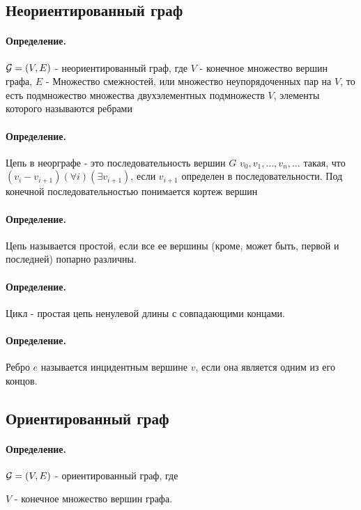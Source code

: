 \documentclass{report}
\begin{document}
\subsection{Неориентированный граф}
\paragraph*{Определение.}
$ {\cal G} = (V, E)$ - неориентированный граф, где $V$ - 
конечное множество вершин графа, $E$ - Множество смежностей,
или множество неупорядоченных пар на  $V$, то есть
подмножество множества  двухэлементных
подмножеств $V$, элементы которого называются ребрами

\paragraph*{Определение.}
Цепь в неорграфе - это последовательность вершин  $G$
$v_0, v_1,\ldots,v_n,\ldots$ такая, что
$(v_i-v_{i+1})(\forall i)(\exists v_{i+1})$, если $v_{i+1}$
определен в последовательности.
Под конечной последовательностью понимается
кортеж вершин

\paragraph*{Определение.}
Цепь называется простой, если все ее вершины
(кроме, может быть, первой и последней) попарно различны.

\paragraph*{Определение.}
Цикл - простая цепь ненулевой длины с совпадающими концами.

\paragraph*{Определение.}
Ребро $e$ называется инцидентным вершине  $v$, если она является одним из его концов.


\subsection{Ориентированный граф}

\paragraph*{Определение.}
$ {\cal G} = (V, E)$ - ориентированный граф, где

$V$ - конечное множество вершин графа.
\end{document}

